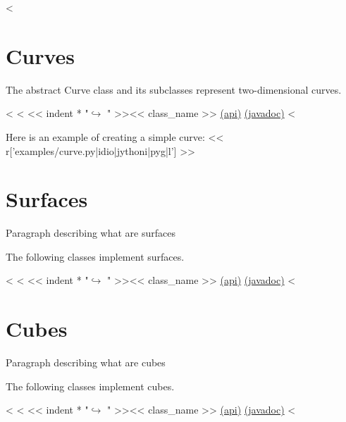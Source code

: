 <%

\section{Curves}

The abstract Curve class and its subclasses represent two-dimensional curves.

\begin{fullwidth}
<%
<%
<< indent * "$\hookrightarrow$ " >><< class_name >> \href{http://docs-static.hq.opengamma.com/0.7.0/analytics/api/<< package_name >>.html#class-<<class_name>>}{(api)} \href{http://docs-static.hq.opengamma.com/0.7.0/java/javadocs/<< class_name.replace(".","/") >>.html}{(javadoc)}
<%
\end{fullwidth}

Here is an example of creating a simple curve:
<< r['examples/curve.py|idio|jythoni|pyg|l'] >>

\section{Surfaces}

Paragraph describing what are surfaces

The following classes implement surfaces.

\begin{fullwidth}
<%
<%
<< indent * "$\hookrightarrow$ " >><< class_name >> \href{http://docs-static.hq.opengamma.com/0.7.0/analytics/api/<< package_name >>.html#class-<<class_name>>}{(api)} \href{http://docs-static.hq.opengamma.com/0.7.0/java/javadocs/<< class_name.replace(".","/") >>.html}{(javadoc)}
<%
\end{fullwidth}

\section{Cubes}

Paragraph describing what are cubes

The following classes implement cubes.

\begin{fullwidth}
<%
<%
<< indent * "$\hookrightarrow$ " >><< class_name >> \href{http://docs-static.hq.opengamma.com/0.7.0/analytics/api/<< package_name >>.html#class-<<class_name>>}{(api)} \href{http://docs-static.hq.opengamma.com/0.7.0/java/javadocs/<< class_name.replace(".","/") >>.html}{(javadoc)}
<%
\end{fullwidth}

